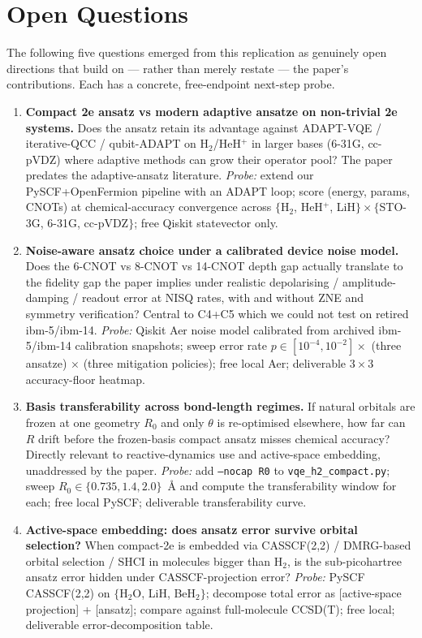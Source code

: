 \section*{Open Questions}

The following five questions emerged from this replication as genuinely open
directions that build on --- rather than merely restate --- the paper's
contributions. Each has a concrete, free-endpoint next-step probe.

\begin{enumerate}

\item \textbf{Compact 2e ansatz vs modern adaptive ansatze on non-trivial 2e
systems.} Does the ansatz retain its advantage against ADAPT-VQE / iterative-QCC
/ qubit-ADAPT on H$_2$/HeH$^+$ in larger bases (6-31G, cc-pVDZ) where adaptive
methods can grow their operator pool? The paper predates the adaptive-ansatz
literature. \emph{Probe:} extend our PySCF+OpenFermion pipeline with an ADAPT
loop; score (energy, params, CNOTs) at chemical-accuracy convergence across
$\{$H$_2$, HeH$^+$, LiH$\} \times \{$STO-3G, 6-31G, cc-pVDZ$\}$; free Qiskit
statevector only.

\item \textbf{Noise-aware ansatz choice under a calibrated device noise model.}
Does the 6-CNOT vs 8-CNOT vs 14-CNOT depth gap actually translate to the
fidelity gap the paper implies under realistic depolarising / amplitude-damping
/ readout error at NISQ rates, with and without ZNE and symmetry verification?
Central to C4+C5 which we could not test on retired ibm-5/ibm-14.
\emph{Probe:} Qiskit Aer noise model calibrated from archived ibm-5/ibm-14
calibration snapshots; sweep error rate $p\in[10^{-4},10^{-2}]\times$ (three
ansatze) $\times$ (three mitigation policies); free local Aer; deliverable
$3{\times}3$ accuracy-floor heatmap.

\item \textbf{Basis transferability across bond-length regimes.} If natural
orbitals are frozen at one geometry $R_0$ and only $\theta$ is re-optimised
elsewhere, how far can $R$ drift before the frozen-basis compact ansatz misses
chemical accuracy? Directly relevant to reactive-dynamics use and active-space
embedding, unaddressed by the paper. \emph{Probe:} add \texttt{--nocap R0} to
\texttt{vqe\_h2\_compact.py}; sweep $R_0 \in \{0.735, 1.4, 2.0\}$~\AA{} and
compute the transferability window for each; free local PySCF; deliverable
transferability curve.

\item \textbf{Active-space embedding: does ansatz error survive orbital
selection?} When compact-2e is embedded via CASSCF(2,2) / DMRG-based orbital
selection / SHCI in molecules bigger than H$_2$, is the sub-picohartree
ansatz error hidden under CASSCF-projection error? \emph{Probe:} PySCF CASSCF(2,2)
on $\{$H$_2$O, LiH, BeH$_2\}$; decompose total error as [active-space projection]
+ [ansatz]; compare against full-molecule CCSD(T); free local; deliverable
error-decomposition table.


\end{enumerate}
